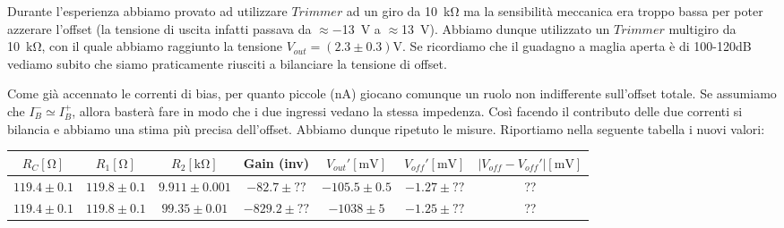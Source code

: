 Durante l'esperienza abbiamo provato ad utilizzare $Trimmer$ ad un giro da \SI{10}{\kilo\ohm} ma la sensibilità meccanica era troppo bassa per poter azzerare l'offset (la tensione di uscita infatti passava da $\approx$\SI{-13}{\volt} a $\approx$\SI{+13}{\volt}). Abbiamo dunque utilizzato un $Trimmer$ multigiro da \SI{10}{\kilo\ohm}, con il quale abbiamo raggiunto la tensione $V_{out}= (2.3\pm0.3)\si{\volt}$. Se ricordiamo che il guadagno a maglia aperta è di 100-120dB vediamo subito che siamo praticamente riusciti a bilanciare la tensione di offset.

Come già accennato le correnti di bias, per quanto piccole (\si{\nano\ampere}) giocano comunque un ruolo non indifferente sull'offset totale. Se assumiamo che $I_B^- \simeq I_B^+ $, allora basterà fare in modo che i due ingressi vedano la stessa impedenza. Così facendo il contributo delle due correnti si bilancia e abbiamo una stima più precisa dell'offset. Abbiamo dunque ripetuto le misure. Riportiamo nella seguente tabella i nuovi valori:



\begin{tabular}{c|c|c|c|c|c|c}
$R_C [\si{\ohm}]$& $R_1[\si{\ohm}]$ & $R_2[\si{\kilo\ohm}]$ & Gain (inv) & $V_{out}' [\si{\milli\volt}]$ & $V_{off}' [\si{\milli\volt}]$ & $|V_{off}-V_{off}'|[\si{\milli\volt}]$ \\ 
\hline 
$119.4\pm0.1$ & $119.8\pm0.1$ & $9.911\pm0.001$  & $-82.7\pm??$ & $-105.5 \pm 0.5$ & $-1.27 \pm??$ & ?? \\
\hline
$119.4\pm0.1$ & $119.8\pm0.1$ & $99.35\pm0.01$  & $-829.2\pm??$ &$ -1038 \pm 5$ & $-1.25 \pm ??$ & ?? 	\\

\end{tabular}

